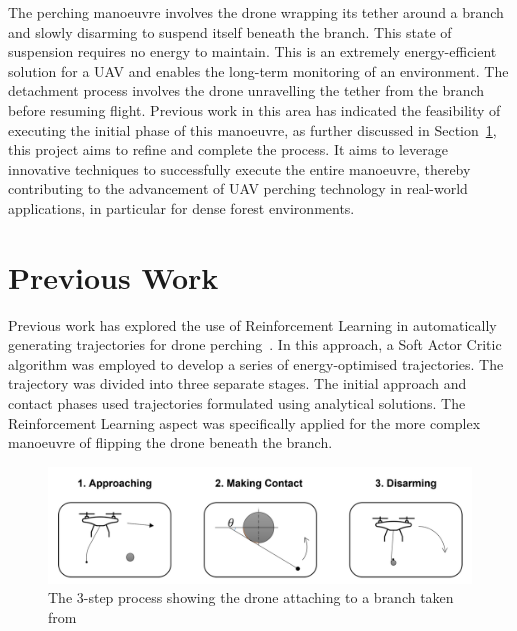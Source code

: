 The perching manoeuvre involves the drone wrapping its tether around a branch and slowly disarming to suspend itself beneath the branch. 
This state of suspension requires no energy to maintain. 
This is an extremely energy-efficient solution for a UAV and enables  the long-term monitoring of an environment. 
The detachment process involves the drone unravelling the tether from the branch before resuming flight. 
Previous work in this area has indicated the feasibility of executing the initial phase of this manoeuvre, as further discussed in Section~\ref{sec:background-prev-work}, this project aims to refine and complete the process. 
It aims to leverage innovative techniques to successfully execute the entire manoeuvre, thereby contributing to the advancement of UAV perching technology in real-world applications, in particular for dense forest environments.

\section{Previous Work}
\label{sec:background-prev-work}


Previous work has explored the use of Reinforcement Learning in automatically generating trajectories for drone perching~\cite{learnedTetheredPerchingFabian}.
In this approach, a Soft Actor Critic algorithm was employed to develop a series of energy-optimised trajectories.
The trajectory was divided into three separate stages.
The initial approach and contact phases used trajectories formulated using analytical solutions.
The Reinforcement Learning aspect was specifically applied for the more complex manoeuvre of flipping the drone beneath the branch.

\begin{figure}[htbp]
  \centering
  \includegraphics[width=\textwidth]{introduction/dronePerching.png}
  \caption{The 3-step process showing the drone attaching to a branch taken from~\cite{learnedTetheredPerchingFabian}}
\label{fig:previous-work-manuever-diagram}
\end{figure}

